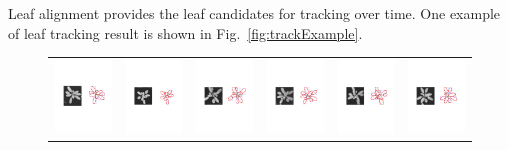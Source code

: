 Leaf alignment provides the leaf candidates for tracking over time. 
One example of leaf tracking result is shown in Fig.~\ref{fig:trackExample}. 



\begin{figure}
\begin{centering}
\begin{tabular}{c c c c c c}
\includegraphics[width=.14\textwidth]{Figures/AlignPerformance/9_1}&
\includegraphics[width=.14\textwidth]{Figures/AlignPerformance/10_1}&
\includegraphics[width=.14\textwidth]{Figures/AlignPerformance/11_1}&
\includegraphics[width=.14\textwidth]{Figures/AlignPerformance/12_1}&
\includegraphics[width=.14\textwidth]{Figures/AlignPerformance/14_1}&
\includegraphics[width=.14\textwidth]{Figures/AlignPerformance/15_1}\\


\end{tabular}
\end{centering}
\end{figure}

